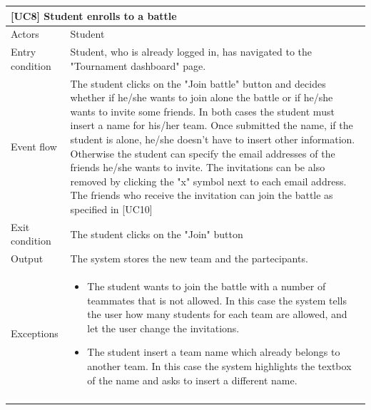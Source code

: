 \documentclass[12pt,oneside,a4paper]{article}
\begin{document}
\begin{table}[htbp]
\begin{tabular}{|l|p{12cm}|}
    \hline
    \multicolumn{2}{|l|}{\textbf{[UC8] Student enrolls to a battle}}\\
    \hline
    Actors & Student\\
    \hline
    Entry condition & Student, who is already logged in, has navigated to the "Tournament dashboard" page.\\
    \hline
    Event flow &  The student clicks on the "Join battle" button and decides whether if he/she wants to join alone the battle or if he/she wants to invite some friends. In both cases the student must insert a name for his/her team. Once submitted the name, if the student is alone, he/she doesn't have to insert other information. Otherwise the student can specify the email addresses of the friends he/she wants to invite. The invitations can be also removed by clicking the "x" symbol next to each email address. The friends who receive the invitation can join the battle as specified in [UC10]\\
    \hline
    Exit condition & The student clicks on the "Join" button\\
    \hline
    Output & The system stores the new team and the partecipants.\\
    \hline
    Exceptions &
    \begin{itemize}
        \item The student wants to join the battle with a number of teammates that is not allowed. In this case the system tells the user how many students for each team are allowed, and let the user change the invitations.
        \item The student insert a team name which already belongs to another team. In this case the system highlights the textbox of the name and asks to insert a different name.
    \end{itemize}\\
    \lasthline
\end{tabular}
\end{table}

\clearpage
\end{document}

